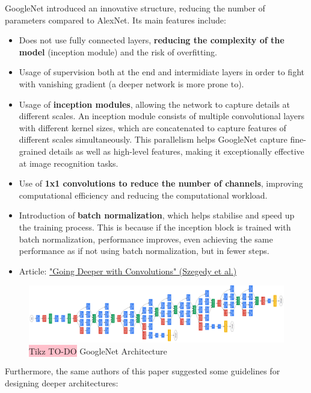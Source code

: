 GoogleNet introduced an innovative structure, reducing the number of parameters compared to AlexNet. Its main features include:
\begin{itemize}
    \item Does not use fully connected layers, \textbf{reducing the complexity of the model} (inception module) and the risk of overfitting.
    \item Usage of supervision both at the end and intermidiate layers in order to fight with vanishing gradient (a deeper network is more prone to). 
    \item Usage of \textbf{inception modules}, allowing the network to capture details at different scales. An inception module consists of multiple convolutional layers with different kernel sizes, which are concatenated to capture features of different scales simultaneously. This parallelism helps GoogleNet capture fine-grained details as well as high-level features, making it exceptionally effective at image recognition tasks.
    \item Use of \textbf{1x1 convolutions to reduce the number of channels}, improving computational efficiency and reducing the computational workload.
    \item Introduction of \textbf{batch normalization}, which helps stabilise and speed up the training process. This is because if the inception block is trained with batch normalization, performance improves, even achieving the same performance as if not using batch normalization, but in fewer steps.
    \item Article: \href{https://arxiv.org/pdf/1409.4842.pdf}{"Going Deeper with Convolutions" (Szegedy et al.)}
\end{itemize}

\begin{figure}[!htbp]
    \centering
    \includegraphics[width=\textwidth]{tikz/chapter5 - GoogleNet.png}
    \caption{{\color{red}\colorbox{pink}{Tikz TO-DO}} GoogleNet Architecture}
\end{figure}


Furthermore, the same authors of this paper suggested some guidelines for designing deeper
architectures:

